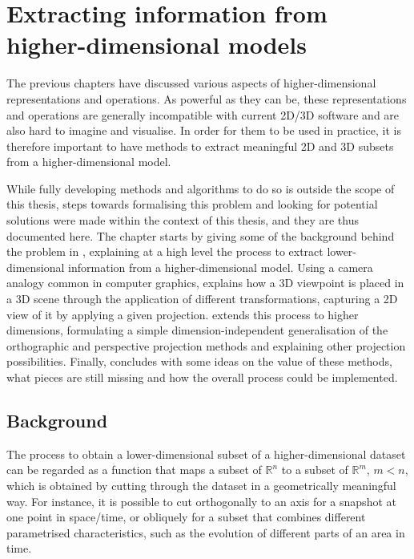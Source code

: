 
\chapter{Extracting information from higher-dimensional models}
\label{ch:slicing}

The previous chapters have discussed various aspects of higher-dimensional representations and operations.
As powerful as they can be, these representations and operations are generally incompatible with current 2D/3D software and are also hard to imagine and visualise.
In order for them to be used in practice, it is therefore important to have methods to extract meaningful 2D and 3D subsets from a higher-dimensional model.

While fully developing methods and algorithms to do so is outside the scope of this thesis, steps towards formalising this problem and looking for potential solutions were made within the context of this thesis, and they are thus documented here.
The chapter starts by giving some of the background behind the problem in , explaining at a high level the process to extract lower-dimensional information from a higher-dimensional model.
Using a camera analogy common in computer graphics,  explains how a 3D viewpoint is placed in a 3D scene through the application of different transformations, capturing a 2D view of it by applying a given projection.
 extends this process to higher dimensions, formulating a simple dimension-independent generalisation of the orthographic and perspective projection methods and explaining other projection possibilities.
Finally,  concludes with some ideas on the value of these methods, what pieces are still missing and how the overall process could be implemented.

\section{Background}
\label{se:slicing-notions}

The process to obtain a lower-dimensional subset of a higher-dimensional dataset can be regarded as a function that maps a subset of $\mathbb{R}^n$ to a subset of $\mathbb{R}^m$, $m < n$, which is obtained by cutting through the dataset in a geometrically meaningful way.
For instance, it is possible to cut orthogonally to an axis for a snapshot at one point in space/time, or obliquely for a subset that combines different parametrised characteristics, such as the evolution of different parts of an area in time.

